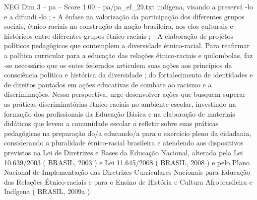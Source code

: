 \begin{textsample}{NEG Dim 3 – pa – Score 1.00 – pa/pa\_ef\_29.txt}
indígena, visando a preservá -lo e a difundi -lo ; - A ênfase na valorização da participação dos diferentes grupos sociais, étnico-raciais na construção da nação brasileira, aos elos culturais e históricos entre diferentes grupos étnico-raciais ; - A elaboração de projetos políticos pedagógicos que contemplem a diversidade étnico-racial.
Para reafirmar a política curricular para a educação das relações étnico-raciais e quilombolas, faz -se necessário que os entes federados articulem suas ações aos princípios da consciência política e histórica da diversidade ; do fortalecimento de identidades e de direitos pautados em ações educativas de combate ao racismo e a discriminações.
Nessa perspectiva, urge desenvolver ações que busquem superar as práticas discriminatórias étnico-raciais no ambiente escolar, investindo na formação dos profissionais da Educação Básica e na elaboração de materiais didáticos que levem a comunidade escolar a refletir sobre suas práticas pedagógicas na preparação do/a educando/a para o exercício pleno da cidadania, considerando a pluralidade étnico-racial brasileira e atendendo aos dispositivos previstos na Lei de Diretrizes e Bases da Educação Nacional, alterada pela Lei 10.639/2003 ( BRASIL, 2003 ) e Lei 11.645/2008 ( BRASIL, 2008 ) e pelo Plano Nacional de Implementação das Diretrizes Curriculares Nacionais para Educação das Relações Étnico-raciais e para o Ensino de História e Cultura Afrobrasileira e Indígena ( BRASIL, 2009a ).

\end{textsample}
